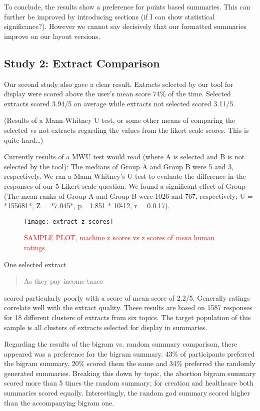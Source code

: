       To conclude, the results show a preference for points based summaries. This can further be improved by introducing sections (if I can show statistical significance?). However we cannot say decisively that our formatted summaries improve on our layout versions.

    \subsection{Study 2: Extract Comparison}
      Our second study also gave a clear result. Extracts selected by our tool for display were scored above the user's mean score 74\% of the time. Selected extracts scored 3.94/5 on average while extracts not selected scored 3.11/5.

      (Results of a Mann-Whitney U test, or some other means of comparing the selected vs not extracts regarding the values from the likert scale scores. This is quite hard\dots)

      Currently results of a MWU test would read (where A is selected and B is not selected by the tool): The medians of Group A and Group B were 5 and 3, respectively. We ran a Mann-Whitney's U test to evaluate the difference in the responses of our 5-Likert scale question. We found a significant effect of Group (The mean ranks of Group A and Group B were 1026 and 767, respectively; U = *155681*, Z = *7.045*, p= 1.851 * 10\^-12, r = 0.0.17).

      \begin{figure}[h]
        \caption{\textcolor{red}{SAMPLE PLOT, machine z scores vs z scores of \textit{mean} human ratings}}
        \centering
        \texttt{[image: extract\_z\_scores]}
      \end{figure}

      One selected extract \blockquote{As they pay income taxes} scored particularly poorly with a score of mean score of 2.2/5. Generally ratings correlate well with the extract quality. These results are based on 1587 responses for 18 different clusters of extracts from six topics. The target population of this sample is all clusters of extracts selected for display in summaries.

      Regarding the results of the bigram vs. random summary comparison, there appeared was a preference for the bigram summary. 43\% of participants preferred the bigram summary, 20\% scored them the same and 34\% preferred the randomly generated summaries. Breaking this down by topic, the abortion bigram summary scored more than 5 times the random summary; for creation and healthcare both summaries scored equally. Interestingly, the random god summary scored higher than the accompanying bigram one.

